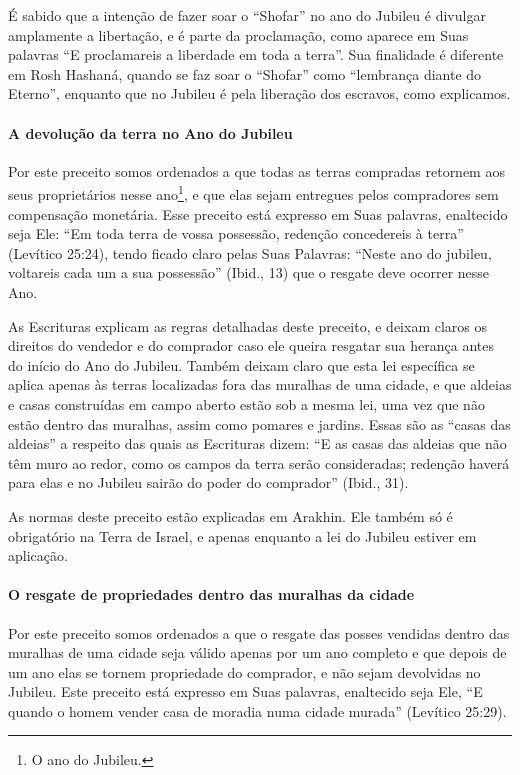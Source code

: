 É sabido que a intenção de fazer soar o ``Shofar'' no ano do Jubileu é
divulgar amplamente a libertação, e é parte da proclamação, como aparece
em Suas palavras ``E proclamareis a liberdade em toda a terra''. Sua
finalidade é diferente em Rosh Hashaná, quando se faz soar o ``Shofar''
como ``lembrança diante do Eterno'', enquanto que no Jubileu é pela
liberação dos escravos, como explicamos.

\paragraph{A devolução da terra no Ano do Jubileu}

Por este preceito somos ordenados a que todas as terras compradas
retornem aos seus proprietários nesse ano\footnote{O ano do Jubileu.}, e que
elas sejam entregues pelos compradores sem compensação monetária. Esse
preceito está expresso em Suas palavras, enaltecido seja Ele: ``Em toda
terra de vossa possessão, redenção concedereis à terra'' (Levítico
25:24), tendo ficado claro pelas Suas Palavras: ``Neste ano do jubileu,
voltareis cada um a sua possessão'' (Ibid., 13) que o resgate deve
ocorrer nesse Ano.

As Escrituras explicam as regras detalhadas deste preceito, e deixam
claros os direitos do vendedor e do comprador caso ele queira resgatar
sua herança antes do início do Ano do Jubileu. Também deixam claro que
esta lei específica se aplica apenas às terras localizadas fora das
muralhas de uma cidade, e que aldeias e casas construídas em campo
aberto estão sob a mesma lei, uma vez que não estão dentro das muralhas,
assim como pomares e jardins. Essas são as ``casas das aldeias'' a
respeito das quais as Escrituras dizem: ``E as casas das aldeias que não
têm muro ao redor, como os campos da terra serão consideradas; redenção
haverá para elas e no Jubileu sairão do poder do comprador'' (Ibid., 31).

As normas deste preceito estão explicadas em Arakhin. Ele também só é
obrigatório na Terra de Israel, e apenas enquanto a lei do Jubileu
estiver em aplicação.

\paragraph{O resgate de propriedades dentro das muralhas da cidade}

Por este preceito somos ordenados a que o resgate das posses vendidas
dentro das muralhas de uma cidade seja válido apenas por um ano
completo e que depois de um ano elas se tornem propriedade do
comprador, e não sejam devolvidas no Jubileu. Este preceito está
expresso em Suas palavras, enaltecido seja Ele, ``E quando o homem
vender casa de moradia numa cidade murada'' (Levítico 25:29).

